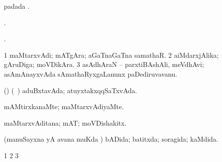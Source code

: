 {{{{{{\bentry
{} 
\gl{\nA}
\expl{}
\bmng
{} padada \bava. 
\emng
\eentry

\bentry
{} 
\gl{\nA}
\expl{}
\bmng
{}. 
\emng
\eentry

\bentry
{}
\gl{\gu}
\expl{}
\bmng
{}. 
\emng
\eentry

\bentry
{} 
\gl{\nA}
\expl{}
\bmng
\bnum
\num{1} maMtarxvAdi; mATgAra; aGaTnaGaTna samathaR. 
\num{2} aiMdarxjAlika; gAruDiga; moVDikAra. 
\num{3} asAdhAraN -- parxtiBAshAli, meVdhAvi; asAmAnayxvAda sAmathaRyxgaLanunx paDediruvavanu. 
\enum
\emng
\eentry

\bentry
{} 
\gl{\gu}
\expl{}
\bmng
(\ashi) (\kanmu\ \birx) aduBxtavAda; atuyxtakxqqSaTxvAda. 
\emng
\eentry

\bentry
{} 
\gl{\kirxvi}
\expl{}
\bmng
mAMtirxkanaMte; maMtarxvAdiyaMte. 
\emng
\eentry

\bentry
{} 
\gl{\nA}
\expl{}
\bmng
maMtarxvAditana; mAT; moVDishakitx. 
\emng
\eentry

\bentry
{} 
\gl{\gu}
\expl{}
\bmng
{} 
\emng
\eentry

\bentry
{} 
\gl{\gu}
\expl{}
\bmng
(manuSayxna yA avana muKda \vi) bADida; batitxda; soragida; kaMdida. 
\emng
\eentry

\bentry
{} 
\gl{\saMkiSx}
\expl{}
\bmng
\bnum
\num{1}  
\num{2}  
\num{3}  
\enum
\emng
\eentry

\bentry
{} 
\gl{\saMkiSx}
\expl{}
\bmng
{} 
\emng
\eentry

\bentry
{} 
\gl{\saMkiSx}
\expl{}
\bmng
{} 
\emng
\eentry

\bentry
{} 
\gl{\saMkiSx}
\expl{}
\bmng
{} 
\emng
\eentry

\bentry
{} 
\gl{\saMkiSx}
\expl{}
\bmng
{} 
\emng
\eentry

\bentry
{} 
\gl{\saMkiSx}
\expl{}
\bmng
{} 
\emng
\eentry

}}}}}}
